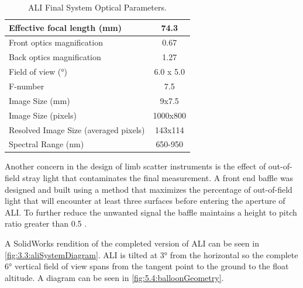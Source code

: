 \documentclass[12pt]{article}
\begin{document}
\begin{table}[!ht]
    \begin{center}
    \begin{tabular}{|l|c|}
      \hline
      Effective focal length (mm) & 74.3 \\
      \hline
      Front optics magnification & 0.67 \\
      \hline
      Back optics magnification & 1.27 \\
      \hline
      Field of view (\si{\degree}) & 6.0 x 5.0 \\
      \hline
      F-number & 7.5 \\
      \hline
      Image Size (mm) & 9x7.5\\
      \hline
      Image Size (pixels) & 1000x800\\
      \hline
      Resolved Image Size (averaged pixels) & 143x114\\
      \hline
      Spectral Range (nm) & 650-950\\
      \hline
    \end{tabular}
    \end{center}
    \caption{ALI Final System Optical Parameters.}
    \label{tab:3.2:ALISystemParameters}
\end{table}

Another concern in the design of limb scatter instruments is the effect of out-of-field stray light that contaminates the final measurement. A front end baffle was designed and 
built using a method that maximizes the percentage of out-of-field light that will encounter at least three surfaces before entering the aperture of ALI. To further reduce the 
unwanted signal the baffle maintains a height to pitch ratio greater than 0.5 \citep{Fischer2008}.

A SolidWorks rendition of the completed version of ALI can be seen in \autoref{fig:3.3:aliSystemDiagram}. ALI is tilted at 3\si{\degree} from the horizontal so the complete 
6\si{\degree} vertical field of view spans from the tangent point to the ground to the float altitude. A diagram can be seen in \autoref{fig:5.4:balloonGeometry}.
\end{document}
